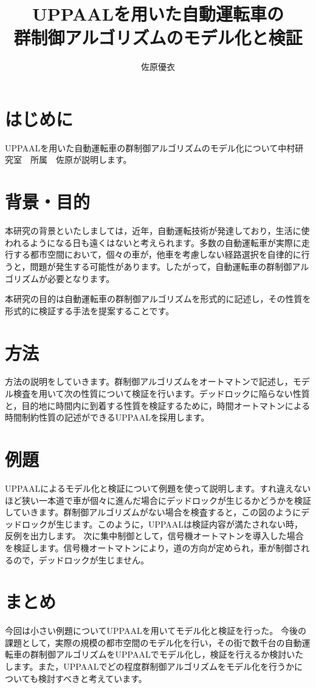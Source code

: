 \documentclass[twocolumn]{jsarticle}
\begin{document}
\title{UPPAALを用いた自動運転車の\\群制御アルゴリズムのモデル化と検証}
\author{佐原優衣}
\maketitle
\section*{はじめに}
UPPAALを用いた自動運転車の群制御アルゴリズムのモデル化について中村研究室　所属　佐原が説明します。
\section*{背景・目的}
本研究の背景といたしましては，近年，自動運転技術が発達しており，生活に使われるようになる日も遠くはないと考えられます。多数の自動運転車が実際に走行する都市空間において，個々の車が，他車を考慮しない経路選択を自律的に行うと，問題が発生する可能性があります。したがって，自動運転車の群制御アルゴリズムが必要となります。

本研究の目的は自動運転車の群制御アルゴリズムを形式的に記述し，その性質を形式的に検証する手法を提案することです。
\section*{方法}
方法の説明をしていきます。群制御アルゴリズムをオートマトンで記述し，モデル検査を用いて次の性質について検証を行います。デッドロックに陥らない性質と，目的地に時間内に到着する性質を検証するために，時間オートマトンによる時間制約性質の記述ができるUPPAALを採用します。
\newpage
\section*{例題}
UPPAALによるモデル化と検証について例題を使って説明します。すれ違えないほど狭い一本道で車が個々に進んだ場合にデッドロックが生じるかどうかを検証していきます。群制御アルゴリズムがない場合を検査すると，この図のようにデッドロックが生じます。このように，UPPAALは検証内容が満たされない時，反例を出力します。
次に集中制御として，信号機オートマトンを導入した場合を検証します。信号機オートマトンにより，道の方向が定められ，車が制御されるので，デッドロックが生じません。
\section*{まとめ}
今回は小さい例題についてUPPAALを用いてモデル化と検証を行った。
今後の課題として，実際の規模の都市空間のモデル化を行い，その街で数千台の自動運転車の群制御アルゴリズムをUPPAALでモデル化し，検証を行えるか検討いたします。また，UPPAALでどの程度群制御アルゴリズムをモデル化を行うかについても検討すべきと考えています。
\end{document}
